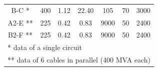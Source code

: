 \documentclass{report}
\begin{document}
\begin{table}[H]
\begin{tabular}{ccccccc}
\multicolumn{1}{c|}{B-C *}                                                  & \multicolumn{1}{c|}{400}                                                       & \multicolumn{1}{c|}{1.12}                                                   & \multicolumn{1}{c|}{22.40}                                                  & \multicolumn{1}{c|}{105}                                                            & \multicolumn{1}{c|}{70}                                                    & 3000                                                 \\
\multicolumn{1}{c|}{A2-E **}                                                & \multicolumn{1}{c|}{225}                                                       & \multicolumn{1}{c|}{0.42}                                                   & \multicolumn{1}{c|}{0.83}                                                   & \multicolumn{1}{c|}{9000}                                                           & \multicolumn{1}{c|}{50}                                                    & 2400                                                 \\
\multicolumn{1}{c|}{B2-F **}                                                & \multicolumn{1}{c|}{225}                                                       & \multicolumn{1}{c|}{0.42}                                                   & \multicolumn{1}{c|}{0.83}                                                   & \multicolumn{1}{c|}{9000}                                                           & \multicolumn{1}{c|}{50}                                                    & 2400                                                 \\
\multicolumn{7}{l}{* data of a single circuit}                                                                                                                 \\
\multicolumn{7}{l}{** data of 6 cables in parallel (400 MVA each)}                                                                                         
\end{tabular}
\end{table}
\end{document}
